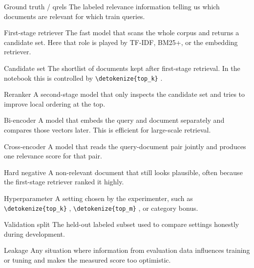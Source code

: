 \documentclass[10pt]{article}
\DeclareRobustCommand{\code}[1]{%
  \ifmmode
    \text{\nolinkurl{\detokenize{#1}}}%
  \else
    \nolinkurl{\detokenize{#1}}%
  \fi
}
\begin{document}
\begin{termcard*}{Ground truth / qrels}
The labeled relevance information telling us which documents are relevant for which train queries.
\end{termcard*}

\begin{termcard*}{First-stage retriever}
The fast model that scans the whole corpus and returns a candidate set. Here that role is played by TF-IDF, BM25+, or the embedding retriever.
\end{termcard*}

\begin{termcard*}{Candidate set}
The shortlist of documents kept after first-stage retrieval. In the notebook this is controlled by \code{top_k}.
\end{termcard*}

\begin{termcard*}{Reranker}
A second-stage model that only inspects the candidate set and tries to improve local ordering at the top.
\end{termcard*}

\begin{termcard*}{Bi-encoder}
A model that embeds the query and document separately and compares those vectors later. This is efficient for large-scale retrieval.
\end{termcard*}

\begin{termcard*}{Cross-encoder}
A model that reads the query-document pair jointly and produces one relevance score for that pair.
\end{termcard*}

\begin{termcard*}{Hard negative}
A non-relevant document that still looks plausible, often because the first-stage retriever ranked it highly.
\end{termcard*}

\begin{termcard*}{Hyperparameter}
A setting chosen by the experimenter, such as \code{top_k}, \code{top_m}, or category bonus.
\end{termcard*}

\begin{termcard*}{Validation split}
The held-out labeled subset used to compare settings honestly during development.
\end{termcard*}

\begin{termcard*}{Leakage}
Any situation where information from evaluation data influences training or tuning and makes the measured score too optimistic.
\end{termcard*}
\end{document}
